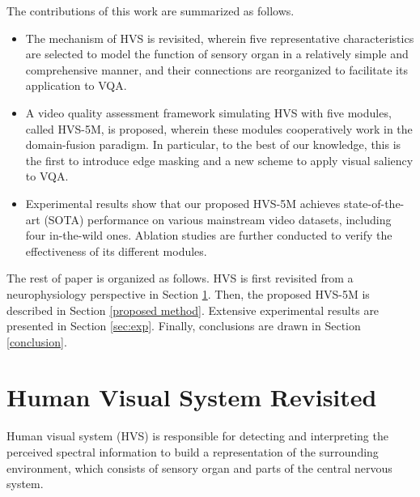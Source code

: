 \documentclass[journal]{IEEEtran}
\begin{document}
The contributions of this work are summarized as follows.
\begin{itemize}
\item The mechanism of HVS is revisited, wherein five representative characteristics are selected to model the function of sensory organ in a relatively simple and comprehensive manner, and their connections are reorganized to facilitate its application to VQA.

\item A video quality assessment framework simulating HVS with five modules, called HVS-5M, is proposed, wherein these modules cooperatively work in the domain-fusion paradigm.
In particular, to the best of our knowledge, this is the first to introduce edge masking and a new scheme to apply visual saliency to VQA.

\item Experimental results show that our proposed HVS-5M achieves state-of-the-art (SOTA) performance on various mainstream video datasets, including four in-the-wild ones. Ablation studies are further conducted to verify the effectiveness of its different modules.
\end{itemize}

The rest of paper is organized as follows. HVS is first revisited from a neurophysiology perspective in Section \ref{HVS revisited}.
Then, the proposed HVS-5M is described in Section \ref{proposed method}.
Extensive experimental results are presented in Section \ref{sec:exp}.
Finally, conclusions are drawn in Section \ref{conclusion}.










\section{Human Visual System Revisited} \label{HVS revisited}

Human visual system (HVS) is responsible for detecting and interpreting the perceived spectral information to build a representation of the surrounding environment, which consists of sensory organ and parts of the central nervous system.
\end{document}

